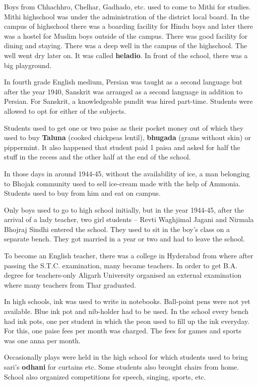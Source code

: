 Boys from Chhachhro, Chelhar, Gadhado, etc. used to come to Mithi for studies.
Mithi highschool was under the administration of the district local board. In
the campus of highschool there was a boarding facility for Hindu boys and later
there was a hostel for Muslim boys outside of the campus. There was good
facility for dining and staying. There was a deep well in the campus of the
highschool. The well went dry later on. It was called \textbf{heladio}. In front of
the school, there was a big playground. 

In fourth grade English medium, Persian was taught as a second language but
after the year 1940, Sanskrit was arranged as a second language in addition to
Persian. For Sanskrit, a knowledgeable pundit was hired part-time. Students
were allowed to opt for either of the subjects. 

Students used to get one or two paise as their pocket money out of which they
used to buy \textbf{Taluna} (cooked chickpeas lentil), \textbf{bhugada} (grams
without skin) or pippermint. It also happened that student paid 1 paisa and
asked for half the stuff in the recess and  the other half at the end of the
school.  

In those days in around 1944-45, without the availability of ice, a man
belonging to Bhojak community used to sell ice-cream made with the help of
Ammonia. Students used to buy from him and eat on campus.

Only boys used to go to high school initially, but in the year 1944-45, after the
arrival of a lady teacher, two girl students -- Revti Waghjimal Jagani and
Nirmala Bhojraj Sindhi entered the school. They used to sit in the boy's class
on a separate bench. They got married in a year or two and had to leave the
school.

To become an English teacher, there was a college in Hyderabad from where after
passing the S.T.C. examination, many became teachers. In order to get B.A.
degree for teachers-only Aligarh University organised an external examination
where many teachers from Thar graduated.

In high schools, ink was used to write in notebooks. Ball-point pens were not yet
available. Blue ink pot and nib-holder had to be used. In the school every bench
had ink pots, one per student in which the peon used to fill up the ink everyday.
For this, one paise fees per month was charged. The fees for games and sports
was one anna per month. 

Occasionally plays were held in the high school for which students used to bring
sari's \textbf{odhani} for curtains etc. Some students also brought chairs from
home. School also organized competitions for speech, singing, sports, etc.

